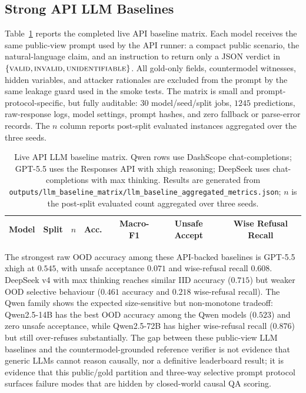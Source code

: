 \documentclass{article}
\theoremstyle{plain}
\theoremstyle{definition}
\theoremstyle{remark}
\begin{document}
\subsection{Strong API LLM Baselines}
\label{sec:llm-baselines}

Table~\ref{tab:llm-baselines} reports the completed live API baseline matrix.
Each model receives the same public-view prompt used by the API runner: a
compact public scenario, the natural-language claim, and an instruction to
return only a JSON verdict in
$\{\textsc{valid}, \textsc{invalid}, \textsc{unidentifiable}\}$. All gold-only
fields, countermodel witnesses, hidden variables, and attacker rationales are
excluded from the prompt by the same leakage guard used in the smoke tests. The
matrix is small and prompt-protocol-specific, but fully auditable: 30
model/seed/split jobs, $1245$ predictions, raw-response logs, model settings,
prompt hashes, and zero fallback or parse-error records. The $n$ column reports
post-split evaluated instances aggregated over the three seeds.

\begin{table}[t]
\caption{Live API LLM baseline matrix. Qwen rows use DashScope
  chat-completions; GPT-5.5 uses the Responses API with xhigh reasoning;
  DeepSeek uses chat-completions with max thinking. Results are generated from
  \texttt{outputs/llm\_baseline\_matrix/llm\_baseline\_aggregated\_metrics.json};
  $n$ is the post-split evaluated count aggregated over three seeds.}
\label{tab:llm-baselines}
\begin{center}
\begin{small}
\begin{sc}
\begin{tabular}{llccccc}
\toprule
Model & Split & $n$ & Acc.\ & Macro-F1 & Unsafe Accept & Wise Refusal Recall \\
\midrule

\bottomrule
\end{tabular}
\end{sc}
\end{small}
\end{center}
\end{table}

The strongest raw OOD accuracy among these API-backed baselines is GPT-5.5
xhigh at $0.545$, with unsafe acceptance $0.071$ and wise-refusal recall
$0.608$. DeepSeek v4 with max thinking reaches similar IID accuracy
($0.715$) but weaker OOD selective behaviour ($0.461$ accuracy and $0.218$
wise-refusal recall). The Qwen family shows the expected size-sensitive but
non-monotone tradeoff: Qwen2.5-14B has the best OOD accuracy among the Qwen
models ($0.523$) and zero unsafe acceptance, while Qwen2.5-72B has higher
wise-refusal recall ($0.876$) but still over-refuses substantially. The gap
between these public-view LLM baselines and the countermodel-grounded
reference verifier is not evidence that generic LLMs cannot reason causally, nor
a definitive leaderboard result; it is evidence that this public/gold partition
and three-way selective prompt protocol surfaces failure modes that are hidden
by closed-world causal QA scoring.
\end{document}
